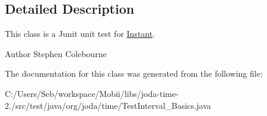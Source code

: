\subsection{Detailed Description}
This class is a Junit unit test for \hyperlink{classorg_1_1joda_1_1time_1_1_instant}{Instant}.

\begin{DoxyAuthor}{Author}
Stephen Colebourne 
\end{DoxyAuthor}


The documentation for this class was generated from the following file\-:\begin{DoxyCompactItemize}
\item 
C\-:/\-Users/\-Seb/workspace/\-Mobii/libs/joda-\/time-\/2./src/test/java/org/joda/time/Test\-Interval\-\_\-\-Basics.\-java\end{DoxyCompactItemize}
